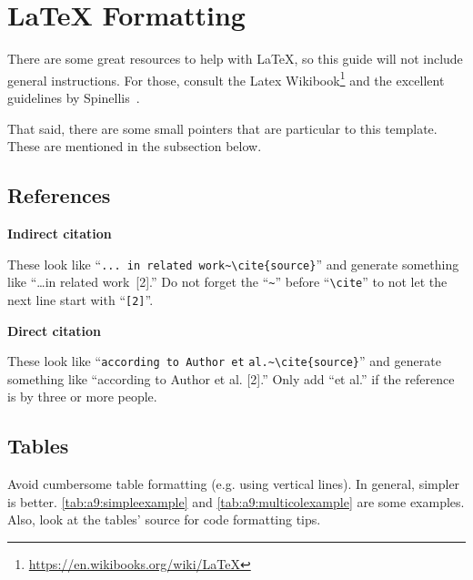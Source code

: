 \chapter{\LaTeX{} Formatting}

There are some great resources to help with \LaTeX,
so this guide will not include general instructions.
For those, consult the Latex Wikibook\footnote{\url{https://en.wikibooks.org/wiki/LaTeX}}
and the excellent guidelines by Spinellis~\cite{spinellis:latexadvice}.

That said, there are some small pointers that are particular to this template.
These are mentioned in the subsection below.

\section{References}
\label{sec:a9:References}

\noindent
\textbf{Indirect citation}

These look like ``\verb|... in related work~\cite{source}|'' and generate something like ``\dots in related work~[2].''
Do not forget the ``\verb|~|'' before ``\verb|\cite|'' to not let the next line start with ``\verb|[2]|''.

\vspace{0.5cm}
\noindent
\textbf{Direct citation}

These look like ``\texttt{according to Author et} \verb|al.~\cite{source}|'' and generate something like ``according to Author et al. [2].''
Only add ``et al.'' if the reference is by three or more people.

\section{Tables}
\label{sec:a9:latex_tables}

Avoid cumbersome table formatting (e.g. using vertical lines).
In general, simpler is better.
\autoref{tab:a9:simpleexample} and \autoref{tab:a9:multicolexample} are some examples.
Also, look at the tables' source for code formatting tips.

